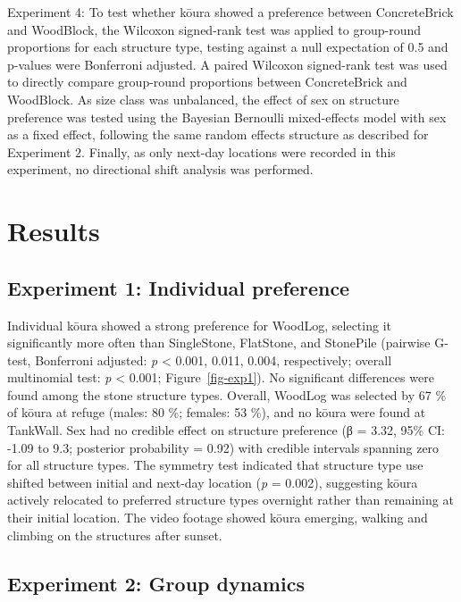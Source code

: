 \documentclass[
  12pt,
  a4paper,
  oneside]{scrbook}
\begin{document}
Experiment 4: To test whether kōura showed a preference between
ConcreteBrick and WoodBlock, the Wilcoxon signed-rank test was applied
to group-round proportions for each structure type, testing against a
null expectation of 0.5 and p-values were Bonferroni adjusted. A paired
Wilcoxon signed-rank test was used to directly compare group-round
proportions between ConcreteBrick and WoodBlock. As size class was
unbalanced, the effect of sex on structure preference was tested using
the Bayesian Bernoulli mixed-effects model with sex as a fixed effect,
following the same random effects structure as described for Experiment
2. Finally, as only next-day locations were recorded in this experiment,
no directional shift analysis was performed.

\section{Results}\label{results-2}

\subsection{Experiment 1: Individual
preference}\label{experiment-1-individual-preference-1}

Individual kōura showed a strong preference for WoodLog, selecting it
significantly more often than SingleStone, FlatStone, and StonePile
(pairwise G-test, Bonferroni adjusted: \emph{p} \textless{} 0.001,
0.011, 0.004, respectively; overall multinomial test: \emph{p}
\textless{} 0.001; Figure~\ref{fig-exp1}). No significant differences
were found among the stone structure types. Overall, WoodLog was
selected by 67 \% of kōura at refuge (males: 80 \%; females: 53 \%), and
no kōura were found at TankWall. Sex had no credible effect on structure
preference (β = 3.32, 95\% CI: -1.09 to 9.3; posterior probability =
0.92) with credible intervals spanning zero for all structure types. The
symmetry test indicated that structure type use shifted between initial
and next-day location (\emph{p} = 0.002), suggesting kōura actively
relocated to preferred structure types overnight rather than remaining
at their initial location. The video footage showed kōura emerging,
walking and climbing on the structures after sunset.

\subsection{Experiment 2: Group
dynamics}\label{experiment-2-group-dynamics-1}
\end{document}
